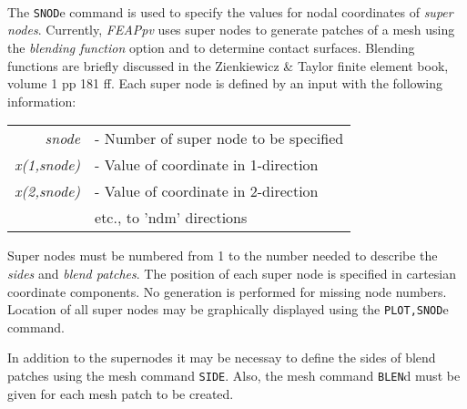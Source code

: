  \\{\smallskip}
 \\{\smallskip}
 \\{\smallskip}
\headb

The {\tt SNOD}e command is used to specify the values for
nodal coordinates of {\it super nodes}.  Currently, {\sl FEAPpv} uses
super nodes to generate patches of a mesh using the {\it blending
function} option and to determine contact surfaces.
Blending functions are briefly discussed in the
Zienkiewicz \& Taylor finite element book, volume 1 pp 181 ff.  Each
super node is defined by an input with the following information:

\begin{center}
\begin{tabular}{r l}
\it snode     & - Number of super node to be specified \\
\it x(1,snode)& - Value of coordinate in 1-direction \\
\it x(2,snode)& - Value of coordinate in 2-direction \\
             &\quad etc., to 'ndm' directions \\
\end{tabular}
\end{center}
Super nodes must be numbered from 1 to the number needed to describe
the {\it sides} and {\it blend patches}.
The position of each super node is specified in cartesian coordinate components.
No generation is performed for missing node numbers.
Location of all super nodes may be graphically displayed using the
{\tt PLOT,SNOD}e command.

In addition to the supernodes it may be necessay to define the sides of
blend patches using the mesh command {\tt SIDE}.  Also, the mesh command
{\tt BLEN}d must be given for each mesh patch to be created.
\vfil\eject
